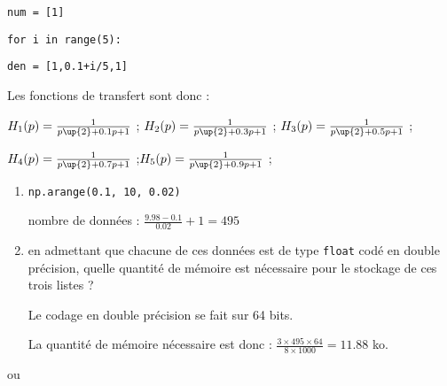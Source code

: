 
\question{}

\begin{dBox}
\hspace{0.5 cm} \texttt{num = [1]}

\texttt{for i in range(5):}

\hspace{0.5 cm} \texttt{den = [1,0.1+i/5,1]}
\end{dBox}

Les fonctions de transfert sont donc :

$H_1(p)=\frac{1}{p\up{2}+0.1p+1}$ ; $H_2(p)=\frac{1}{p\up{2}+0.3p+1}$ ; $H_3(p)=\frac{1}{p\up{2}+0.5p+1}$ ;

$H_4(p)=\frac{1}{p\up{2}+0.7p+1}$ ;$H_5(p)=\frac{1}{p\up{2}+0.9p+1}$ ; 


\question{}

\begin{enumerate}
\item \texttt{np.arange(0.1, 10, 0.02)}


nombre de données : $\frac{9.98-0.1}{0.02}+1=495$
\item en admettant que chacune de ces données est de type \texttt{float} codé en double précision, quelle quantité de mémoire est nécessaire pour le stockage de ces trois listes ?

Le codage en double précision se fait sur 64 bits.

La quantité de mémoire nécessaire est donc : $\frac{3 \times 495 \times 64}{8 \times 1000} = 11.88$ ko.

\end{enumerate}


\question{}



ou 




%
%


\question{} 

